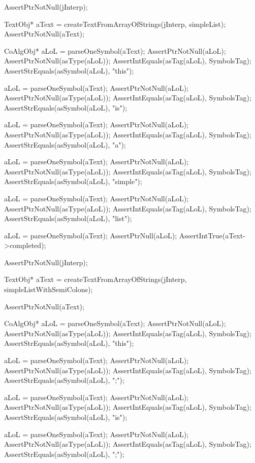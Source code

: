 \startCTest
  AssertPtrNotNull(jInterp);

  TextObj* aText =
    createTextFromArrayOfStrings(jInterp, simpleList);
  AssertPtrNotNull(aText);

  CoAlgObj* aLoL = parseOneSymbol(aText);
  AssertPtrNotNull(aLoL);
  AssertPtrNotNull(asType(aLoL));
  AssertIntEquals(asTag(aLoL), SymbolsTag);
  AssertStrEquals(asSymbol(aLoL), "this");

  aLoL = parseOneSymbol(aText);
  AssertPtrNotNull(aLoL);
  AssertPtrNotNull(asType(aLoL));
  AssertIntEquals(asTag(aLoL), SymbolsTag);
  AssertStrEquals(asSymbol(aLoL), "is");

  aLoL = parseOneSymbol(aText);
  AssertPtrNotNull(aLoL);
  AssertPtrNotNull(asType(aLoL));
  AssertIntEquals(asTag(aLoL), SymbolsTag);
  AssertStrEquals(asSymbol(aLoL), "a");

  aLoL = parseOneSymbol(aText);
  AssertPtrNotNull(aLoL);
  AssertPtrNotNull(asType(aLoL));
  AssertIntEquals(asTag(aLoL), SymbolsTag);
  AssertStrEquals(asSymbol(aLoL), "simple");

  aLoL = parseOneSymbol(aText);
  AssertPtrNotNull(aLoL);
  AssertPtrNotNull(asType(aLoL));
  AssertIntEquals(asTag(aLoL), SymbolsTag);
  AssertStrEquals(asSymbol(aLoL), "list");

  aLoL = parseOneSymbol(aText);
  AssertPtrNull(aLoL);
  AssertIntTrue(aText->completed);
\stopCTest
\stopTestCase

\startCTest
  AssertPtrNotNull(jInterp);

  TextObj* aText =
    createTextFromArrayOfStrings(jInterp, simpleListWithSemiColons);

  AssertPtrNotNull(aText);

  CoAlgObj* aLoL = parseOneSymbol(aText);
  AssertPtrNotNull(aLoL);
  AssertPtrNotNull(asType(aLoL));
  AssertIntEquals(asTag(aLoL), SymbolsTag);
  AssertStrEquals(asSymbol(aLoL), "this");

  aLoL = parseOneSymbol(aText);
  AssertPtrNotNull(aLoL);
  AssertPtrNotNull(asType(aLoL));
  AssertIntEquals(asTag(aLoL), SymbolsTag);
  AssertStrEquals(asSymbol(aLoL), ";");

  aLoL = parseOneSymbol(aText);
  AssertPtrNotNull(aLoL);
  AssertPtrNotNull(asType(aLoL));
  AssertIntEquals(asTag(aLoL), SymbolsTag);
  AssertStrEquals(asSymbol(aLoL), "is");

  aLoL = parseOneSymbol(aText);
  AssertPtrNotNull(aLoL);
  AssertPtrNotNull(asType(aLoL));
  AssertIntEquals(asTag(aLoL), SymbolsTag);
  AssertStrEquals(asSymbol(aLoL), ";");

